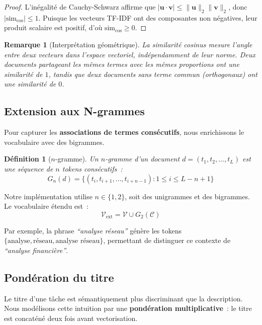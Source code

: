 \documentclass[12pt, a4paper]{article}
\newtheorem{definition}{Définition}[section]
\newtheorem{remark}{Remarque}[section]
\begin{document}
\begin{proof}
L'inégalité de Cauchy-Schwarz affirme que $|\mathbf{u} \cdot \mathbf{v}| \leq \|\mathbf{u}\|_2 \|\mathbf{v}\|_2$, donc $|\mathrm{sim}_{\cos}| \leq 1$. Puisque les vecteurs TF-IDF ont des composantes non négatives, leur produit scalaire est positif, d'où $\mathrm{sim}_{\cos} \geq 0$.
\end{proof}

\begin{remark}[Interprétation géométrique]
La similarité cosinus mesure \textit{l'angle} entre deux vecteurs dans l'espace vectoriel, indépendamment de leur norme. Deux documents partageant les mêmes termes avec les mêmes proportions ont une similarité de $1$, tandis que deux documents sans terme commun (orthogonaux) ont une similarité de $0$.
\end{remark}

\subsection{Extension aux N-grammes}

Pour capturer les \textbf{associations de termes consécutifs}, nous enrichissons le vocabulaire avec des bigrammes.

\begin{definition}[$n$-gramme]
Un $n$-gramme d'un document $d = (t_1, t_2, \ldots, t_L)$ est une séquence de $n$ tokens consécutifs~:
\[
G_n(d) = \bigl\{(t_i, t_{i+1}, \ldots, t_{i+n-1}) : 1 \leq i \leq L-n+1\bigr\}
\]
\end{definition}

Notre implémentation utilise $n \in \{1, 2\}$, soit des unigrammes et des bigrammes. Le vocabulaire étendu est~:
\[
\mathcal{V}_{\text{ext}} = \mathcal{V} \cup G_2(\mathcal{C})
\]

Par exemple, la phrase \textit{``analyse réseau''} génère les tokens $\{\text{analyse}, \text{réseau}, \text{analyse réseau}\}$, permettant de distinguer ce contexte de \textit{``analyse financière''}.

\subsection{Pondération du titre}

Le titre d'une tâche est sémantiquement plus discriminant que la description. Nous modélisons cette intuition par une \textbf{pondération multiplicative}~: le titre est concaténé deux fois avant vectorisation.
\end{document}
